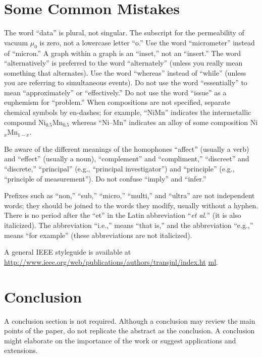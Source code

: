 \documentclass[journal,twoside,web]{ieeecolor}
\begin{document}
\section{Some Common Mistakes}
The word ``data'' is plural, not singular. The subscript for the 
permeability of vacuum $\mu _{0}$ is zero, not a lowercase letter 
``o.'' Use the word ``micrometer'' instead of ``micron.'' A graph within a graph is an 
``inset,'' not an ``insert.'' The word ``alternatively'' is preferred to the 
word ``alternately'' (unless you really mean something that alternates). Use 
the word ``whereas'' instead of ``while'' (unless you are referring to 
simultaneous events). Do not use the word ``essentially'' to mean 
``approximately'' or ``effectively.'' Do not use the word ``issue'' as a 
euphemism for ``problem.'' When compositions are not specified, separate 
chemical symbols by en-dashes; for example, ``NiMn'' indicates the 
intermetallic compound Ni$_{0.5}$Mn$_{0.5}$ whereas 
``Ni--Mn'' indicates an alloy of some composition 
Ni$_{x}$Mn$_{1-x}$.

Be aware of the different meanings of the homophones ``affect'' (usually a 
verb) and ``effect'' (usually a noun), ``complement'' and ``compliment,'' 
``discreet'' and ``discrete,'' ``principal'' (e.g., ``principal 
investigator'') and ``principle'' (e.g., ``principle of measurement''). Do 
not confuse ``imply'' and ``infer.'' 

Prefixes such as ``non,'' ``sub,'' ``micro,'' ``multi,'' and ``ultra'' are 
not independent words; they should be joined to the words they modify, 
usually without a hyphen. There is no period after the ``et'' in the Latin 
abbreviation ``\emph{et al.}'' (it is also italicized). The abbreviation ``i.e.,'' means 
``that is,'' and the abbreviation ``e.g.,'' means ``for example'' (these 
abbreviations are not italicized).

A general IEEE styleguide is available at \underline{http://www.ieee.org/web/publications/authors/transjnl/index.ht}
\discretionary{}{}{}\underline{ml}.

\section{Conclusion}
A conclusion section is not required. Although a conclusion may review the 
main points of the paper, do not replicate the abstract as the conclusion.
A conclusion might elaborate on the importance of the work or suggest 
applications and extensions.

\appendices
\end{document}

